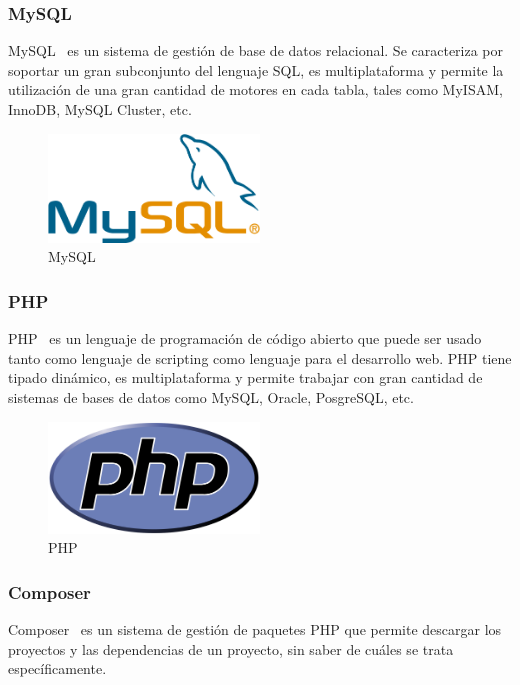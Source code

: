 \subsubsection*{MySQL}

MySQL~\cite{mysql} es un sistema de gestión de base de datos relacional. Se caracteriza por soportar un gran subconjunto del lenguaje SQL, es multiplataforma y permite la utilización de una gran cantidad de motores en cada tabla, tales como MyISAM, InnoDB, MySQL Cluster, etc.

\begin{figure}[tbh]
\centering
\label{fig:mysql}
\includegraphics[width=0.5\textwidth]{imagenes/MySQL}
\caption{MySQL}
\end{figure}

\subsubsection*{PHP}

PHP~\cite{php} es un lenguaje de programación de código abierto que puede ser usado tanto como lenguaje de scripting como lenguaje para el desarrollo web. PHP tiene tipado dinámico, es multiplataforma y permite trabajar con gran cantidad de sistemas de bases de datos como MySQL, Oracle, PosgreSQL, etc.

\begin{figure}[tbh]
\centering
\label{fig:php}
\includegraphics[width=0.5\textwidth]{imagenes/PHP}
\caption{PHP}
\end{figure}

\subsubsection*{Composer}

Composer~\cite{composer} es un sistema de gestión de paquetes PHP que permite descargar los proyectos y las dependencias de un proyecto, sin saber de cuáles se trata específicamente. 

